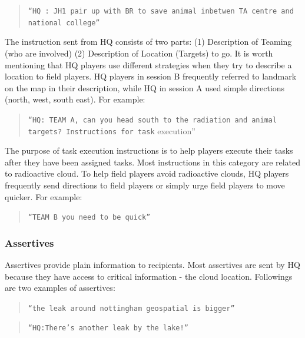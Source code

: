 \begin{quote}
\texttt{``HQ : JH1 pair up with BR to save animal inbetwen TA centre and national college''}\\
\end{quote}

The instruction sent from HQ consists of two parts: (1) Description of Teaming (who are involved) (2) Description of Location (Targets) to go. It is worth mentioning that HQ players use different strategies when they try to describe a location to field players. HQ players in session B frequently referred to landmark on the map in their description, while HQ in session A used simple directions (north, west, south east). For example:\\

\begin{quote}
\texttt{``HQ: TEAM A, can you head south to the radiation and animal targets? Instructions for task} execution''\\
\end{quote}

The purpose of task execution instructions is to help players execute their tasks after they have been assigned tasks. Most instructions in this category are related to radioactive cloud. To help field players avoid radioactive clouds, HQ players frequently send directions to field players or simply urge field players to move quicker. For example:

\begin{quote}
\texttt{``TEAM B you need to be quick''} \\
\end{quote}

\subsubsection{Assertives}

Assertives provide plain information to recipients. Most assertives are sent by HQ because they have access to critical information - the cloud location. Followings are two examples of assertives:\\

\begin{quote}
\texttt{``the leak around nottingham geospatial is bigger''}\\
\end{quote}

\begin{quote}
\texttt{``HQ:There's another leak by the lake!''}\\
\end{quote}

